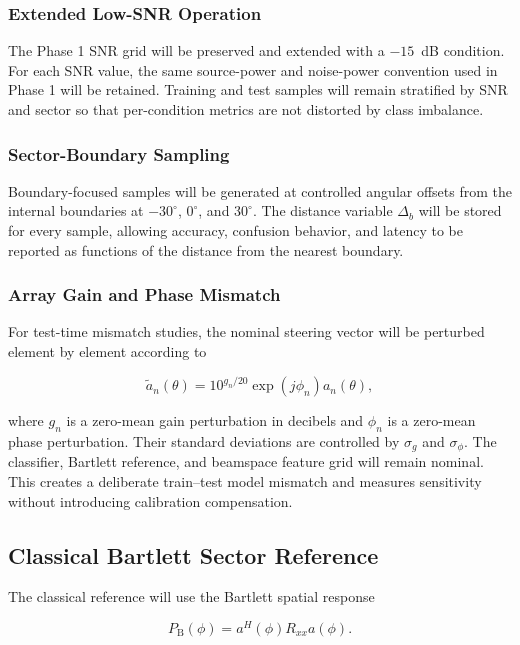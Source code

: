 \subsubsection{Extended Low-SNR Operation}

The Phase 1 SNR grid will be preserved and extended with a $-15$~dB condition. For each SNR value, the same source-power and noise-power convention used in Phase 1 will be retained. Training and test samples will remain stratified by SNR and sector so that per-condition metrics are not distorted by class imbalance.

\subsubsection{Sector-Boundary Sampling}

Boundary-focused samples will be generated at controlled angular offsets from the internal boundaries at $-30^{\circ}$, $0^{\circ}$, and $30^{\circ}$. The distance variable $\Delta_b$ will be stored for every sample, allowing accuracy, confusion behavior, and latency to be reported as functions of the distance from the nearest boundary.

\subsubsection{Array Gain and Phase Mismatch}

For test-time mismatch studies, the nominal steering vector will be perturbed element by element according to

\[
\widetilde{a}_n(\theta)
=
10^{g_n/20}
\exp\!\left(j\phi_n\right)
a_n(\theta),
\]

where $g_n$ is a zero-mean gain perturbation in decibels and $\phi_n$ is a zero-mean phase perturbation. Their standard deviations are controlled by $\sigma_g$ and $\sigma_{\phi}$. The classifier, Bartlett reference, and beamspace feature grid will remain nominal. This creates a deliberate train--test model mismatch and measures sensitivity without introducing calibration compensation.

\subsection{Classical Bartlett Sector Reference}

The classical reference will use the Bartlett spatial response

\[
P_{\mathrm{B}}(\phi)
=
a^{H}(\phi)R_{xx}a(\phi).
\]

